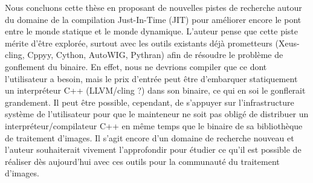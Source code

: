 Nous concluons cette thèse en proposant de nouvelles pistes de recherche autour du domaine de la compilation
Just-In-Time (JIT) pour améliorer encore le pont entre le monde statique et le monde dynamique. L'auteur pense que cette
piste mérite d'être explorée, surtout avec les outils existants déjà prometteurs (Xeus-cling, Cppyy, Cython, AutoWIG,
Pythran) afin de résoudre le problème de gonflement du binaire. En effet, nous ne devrions compiler que ce dont
l'utilisateur a besoin, mais le prix d'entrée peut être d'embarquer statiquement un interpréteur C++ (LLVM/cling ?) dans
son binaire, ce qui en soi le gonflerait grandement. Il peut être possible, cependant, de s'appuyer sur l'infrastructure
système de l'utilisateur pour que le mainteneur ne soit pas obligé de distribuer un interpréteur/compilateur C++ en même
temps que le binaire de sa bibliothèque de traitement d'images. Il s'agit encore d'un domaine de recherche nouveau et
l'auteur souhaiterait vivement l'approfondir pour étudier ce qu'il est possible de réaliser dès aujourd'hui avec ces
outils pour la communauté du traitement d'images.
